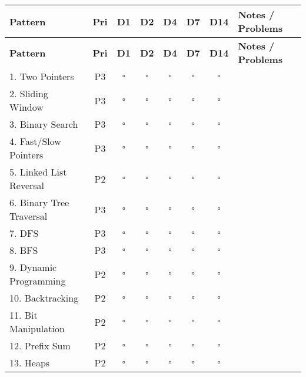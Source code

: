 \documentclass[10pt]{article}
\begin{document}
\begin{center}
\small
\begin{longtable}{|p{3.2cm}|c|c|c|c|c|c|p{3.5cm}|}
\hline
\textbf{Pattern} & \textbf{Pri} & \textbf{D1} & \textbf{D2} & \textbf{D4} & \textbf{D7} & \textbf{D14} & \textbf{Notes / Problems} \\
\hline
\endfirsthead
\hline
\textbf{Pattern} & \textbf{Pri} & \textbf{D1} & \textbf{D2} & \textbf{D4} & \textbf{D7} & \textbf{D14} & \textbf{Notes / Problems} \\
\hline
\endhead
\hline
\endfoot

1. Two Pointers & \cellcolor{priority3}P3 & $\square$ & $\square$ & $\square$ & $\square$ & $\square$ & \\
\hline
2. Sliding Window & \cellcolor{priority3}P3 & $\square$ & $\square$ & $\square$ & $\square$ & $\square$ & \\
\hline
3. Binary Search & \cellcolor{priority3}P3 & $\square$ & $\square$ & $\square$ & $\square$ & $\square$ & \\
\hline
4. Fast/Slow Pointers & \cellcolor{priority3}P3 & $\square$ & $\square$ & $\square$ & $\square$ & $\square$ & \\
\hline
5. Linked List Reversal & \cellcolor{priority2}P2 & $\square$ & $\square$ & $\square$ & $\square$ & $\square$ & \\
\hline
6. Binary Tree Traversal & \cellcolor{priority3}P3 & $\square$ & $\square$ & $\square$ & $\square$ & $\square$ & \\
\hline
7. DFS & \cellcolor{priority3}P3 & $\square$ & $\square$ & $\square$ & $\square$ & $\square$ & \\
\hline
8. BFS & \cellcolor{priority3}P3 & $\square$ & $\square$ & $\square$ & $\square$ & $\square$ & \\
\hline
9. Dynamic Programming & \cellcolor{priority2}P2 & $\square$ & $\square$ & $\square$ & $\square$ & $\square$ & \\
\hline
10. Backtracking & \cellcolor{priority2}P2 & $\square$ & $\square$ & $\square$ & $\square$ & $\square$ & \\
\hline
11. Bit Manipulation & \cellcolor{priority2}P2 & $\square$ & $\square$ & $\square$ & $\square$ & $\square$ & \\
\hline
12. Prefix Sum & \cellcolor{priority2}P2 & $\square$ & $\square$ & $\square$ & $\square$ & $\square$ & \\
\hline
13. Heaps & \cellcolor{priority2}P2 & $\square$ & $\square$ & $\square$ & $\square$ & $\square$ & \\

\end{longtable}
\end{center}
\end{document}
